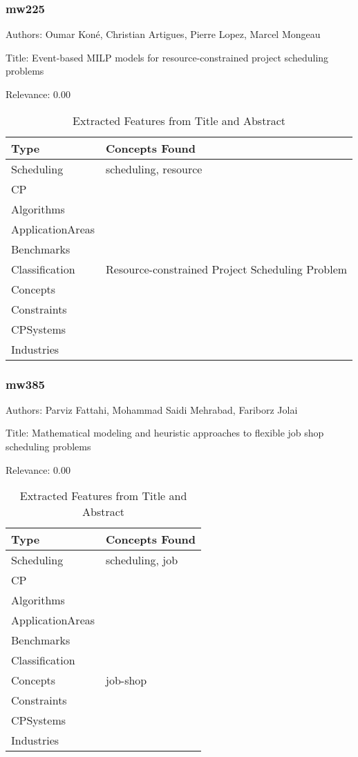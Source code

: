 \subsubsection{mw225}
\label{mw:mw225}

Authors: Oumar Koné, Christian Artigues, Pierre Lopez, Marcel Mongeau

Title: Event-based MILP models for resource-constrained project scheduling problems

Relevance:  0.00

{\scriptsize
\begin{longtable}{p{2cm}p{20cm}}
\caption{Extracted Features from Title and Abstract}\\ \toprule
Type & Concepts Found\\ \midrule
\endhead
\bottomrule
\endfoot
Scheduling & scheduling, resource\\ 
CP & \\ 
Algorithms & \\ 
ApplicationAreas & \\ 
Benchmarks & \\ 
Classification & Resource-constrained Project Scheduling Problem\\ 
Concepts & \\ 
Constraints & \\ 
CPSystems & \\ 
Industries & \\ 
\end{longtable}
}



\subsubsection{mw385}
\label{mw:mw385}

Authors: Parviz Fattahi, Mohammad Saidi Mehrabad, Fariborz Jolai

Title: Mathematical modeling and heuristic approaches to flexible job shop scheduling problems

Relevance:  0.00

{\scriptsize
\begin{longtable}{p{2cm}p{20cm}}
\caption{Extracted Features from Title and Abstract}\\ \toprule
Type & Concepts Found\\ \midrule
\endhead
\bottomrule
\endfoot
Scheduling & scheduling, job\\ 
CP & \\ 
Algorithms & \\ 
ApplicationAreas & \\ 
Benchmarks & \\ 
Classification & \\ 
Concepts & job-shop\\ 
Constraints & \\ 
CPSystems & \\ 
Industries & \\ 
\end{longtable}
}



